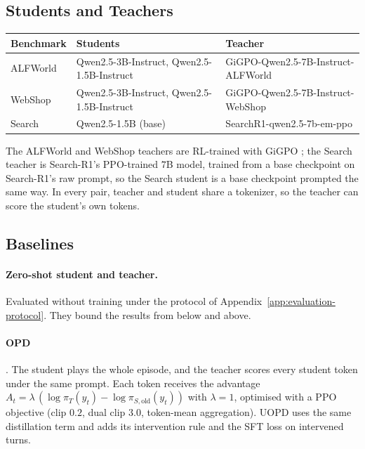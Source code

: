\subsection{Students and Teachers}
\label{app:models}

\begin{center}\small
\begin{tabular}{@{}l l l@{}}
\toprule
Benchmark & Students & Teacher \\
\midrule
ALFWorld & Qwen2.5-3B-Instruct, Qwen2.5-1.5B-Instruct & GiGPO-Qwen2.5-7B-Instruct-ALFWorld \\
WebShop & Qwen2.5-3B-Instruct, Qwen2.5-1.5B-Instruct & GiGPO-Qwen2.5-7B-Instruct-WebShop \\
Search & Qwen2.5-1.5B (base) & SearchR1-qwen2.5-7b-em-ppo \\
\bottomrule
\end{tabular}
\end{center}

\noindent The ALFWorld and WebShop teachers are RL-trained with GiGPO \citep{feng2025gigpo}; the Search
teacher is Search-R1's PPO-trained $7$B model, trained from a base checkpoint on Search-R1's raw
prompt, so the Search student is a base checkpoint prompted the same way. In every pair, teacher and
student share a tokenizer, so the teacher can score the student's own tokens.

\subsection{Baselines}
\label{app:baselines}

\paragraph{Zero-shot student and teacher.} Evaluated without training under the protocol of
Appendix~\ref{app:evaluation-protocol}. They bound the results from below and above.

\paragraph{OPD} \citep{agarwal2024policy,lu2025onpolicydistillation}. The student plays the whole
episode, and the teacher scores every student token under the same prompt. Each token receives the
advantage $A_t = \lambda\,(\log\pi_T(y_t) - \log\pi_{S,\mathrm{old}}(y_t))$ with $\lambda=1$, optimised
with a PPO objective (clip $0.2$, dual clip $3.0$, token-mean aggregation). UOPD uses the same
distillation term and adds its intervention rule and the SFT loss on intervened turns.

